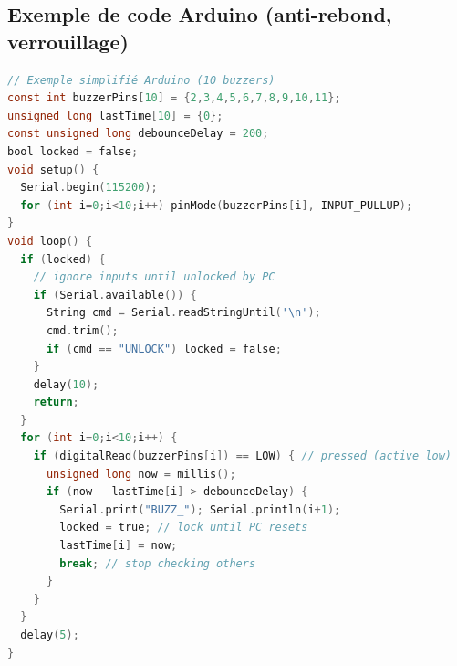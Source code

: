 \documentclass[a4paper,11pt]{article}
\begin{document}
\subsection{Exemple de code Arduino (anti-rebond, verrouillage)}
\begin{lstlisting}[language=C]
// Exemple simplifié Arduino (10 buzzers)
const int buzzerPins[10] = {2,3,4,5,6,7,8,9,10,11};
unsigned long lastTime[10] = {0};
const unsigned long debounceDelay = 200;
bool locked = false;
void setup() {
  Serial.begin(115200);
  for (int i=0;i<10;i++) pinMode(buzzerPins[i], INPUT_PULLUP);
}
void loop() {
  if (locked) {
    // ignore inputs until unlocked by PC
    if (Serial.available()) {
      String cmd = Serial.readStringUntil('\n');
      cmd.trim();
      if (cmd == "UNLOCK") locked = false;
    }
    delay(10);
    return;
  }
  for (int i=0;i<10;i++) {
    if (digitalRead(buzzerPins[i]) == LOW) { // pressed (active low)
      unsigned long now = millis();
      if (now - lastTime[i] > debounceDelay) {
        Serial.print("BUZZ_"); Serial.println(i+1);
        locked = true; // lock until PC resets
        lastTime[i] = now;
        break; // stop checking others
      }
    }
  }
  delay(5);
}
\end{lstlisting}
\end{document}
